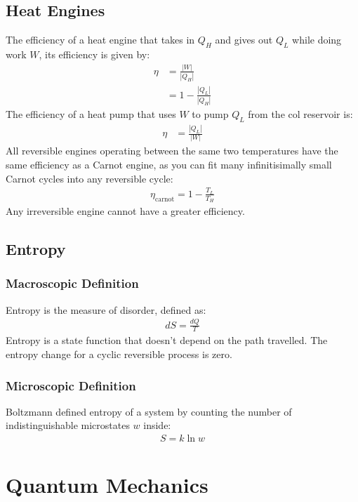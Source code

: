 \documentclass[11pt]{article}
\begin{document}
\begin{multicols*}{3}
\subsection{Heat Engines}
The efficiency of a heat engine that takes in $Q_H$ and gives out $Q_L$ while doing work $W$, its efficiency is given by:
\begin{align*}
  \eta &= \frac{|W|}{|Q_H|} \\
  &= 1 - \frac{|Q_L|}{|Q_H|}
\end{align*}
The efficiency of a heat pump that uses $W$ to pump $Q_L$ from the col reservoir is:
\begin{align*}
  \eta &= \frac{|Q_L|}{|W|}
\end{align*}
All reversible engines operating between the same two temperatures have the same efficiency as a Carnot engine, as you can fit many infinitisimally small Carnot cycles into any reversible cycle:
\begin{align*}
  \eta_{\text{carnot}} = 1 - \frac{T_L}{T_H}
\end{align*}
Any irreversible engine cannot have a greater efficiency.

\subsection{Entropy}
\subsubsection{Macroscopic Definition}
Entropy is the measure of disorder, defined as:
\begin{align*}
  dS = \frac{dQ}{T}
\end{align*}
Entropy is a state function that doesn't depend on the path travelled. The entropy change for a cyclic reversible process is zero.
\subsubsection{Microscopic Definition}
Boltzmann defined entropy of a system by counting the number of indistinguishable microstates $w$ inside:
\begin{align*}
  S = k \ln w
\end{align*}

\section{Quantum Mechanics}

\end{multicols*}
\end{document}
